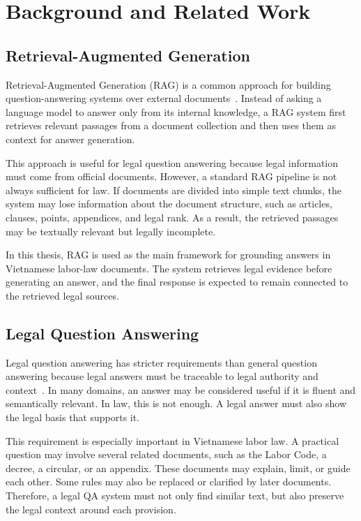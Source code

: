 \section{Background and Related Work}

\subsection{Retrieval-Augmented Generation}
Retrieval-Augmented Generation (RAG) is a common approach for building question-answering systems over external documents~\cite{lewis2020retrieval}. Instead of asking a language model to answer only from its internal knowledge, a RAG system first retrieves relevant passages from a document collection and then uses them as context for answer generation.

This approach is useful for legal question answering because legal information must come from official documents. However, a standard RAG pipeline is not always sufficient for law. If documents are divided into simple text chunks, the system may lose information about the document structure, such as articles, clauses, points, appendices, and legal rank. As a result, the retrieved passages may be textually relevant but legally incomplete.

In this thesis, RAG is used as the main framework for grounding answers in Vietnamese labor-law documents. The system retrieves legal evidence before generating an answer, and the final response is expected to remain connected to the retrieved legal sources.

\subsection{Legal Question Answering}
Legal question answering has stricter requirements than general question answering because legal answers must be traceable to legal authority and context~\cite{guha2023legalbench,zhong2020legalqa}. In many domains, an answer may be considered useful if it is fluent and semantically relevant. In law, this is not enough. A legal answer must also show the legal basis that supports it.

This requirement is especially important in Vietnamese labor law. A practical question may involve several related documents, such as the Labor Code, a decree, a circular, or an appendix. These documents may explain, limit, or guide each other. Some rules may also be replaced or clarified by later documents. Therefore, a legal QA system must not only find similar text, but also preserve the legal context around each provision.

